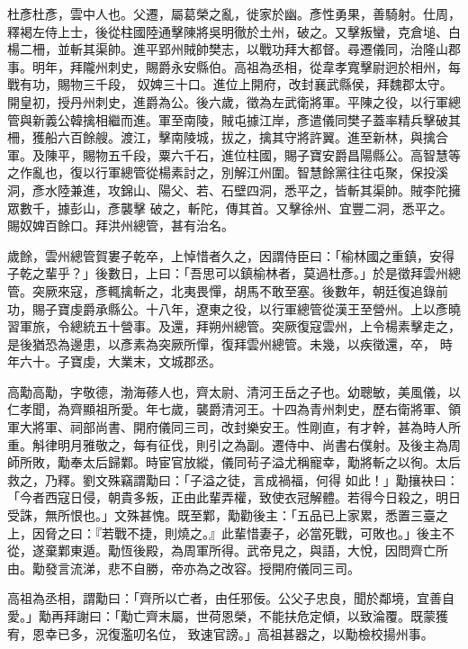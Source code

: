 
\begin{pinyinscope}

 杜彥杜彥，雲中人也。父遷，屬葛榮之亂，徙家於幽。彥性勇果，善騎射。仕周，釋褐左侍上士，後從柱國陸通擊陳將吳明徹於土州，破之。又擊叛蠻，克倉塠、白楊二柵，並斬其渠帥。進平郢州賊帥樊志，以戰功拜大都督。尋遷儀同，治隆山郡事。明年，拜隴州刺史，賜爵永安縣伯。高祖為丞相，從韋孝寬擊尉迥於相州，每戰有功，賜物三千段，
 奴婢三十口。進位上開府，改封襄武縣侯，拜魏郡太守。開皇初，授丹州刺史，進爵為公。後六歲，徵為左武衛將軍。平陳之役，以行軍總管與新義公韓擒相繼而進。軍至南陵，賊屯據江岸，彥遣儀同樊子蓋率精兵擊破其柵，獲船六百餘艘。渡江，擊南陵城，拔之，擒其守將許翼。進至新林，與擒合軍。及陳平，賜物五千段，粟六千石，進位柱國，賜子寶安爵昌陽縣公。高智慧等之作亂也，復以行軍總管從楊素討之，別解江州圍。智慧餘黨往往屯聚，保投溪洞，彥水陸兼進，攻錦山、陽父、若、石壁四洞，悉平之，皆斬其渠帥。賊李陀擁眾數千，據彭山，彥襲擊
 破之，斬陀，傳其首。又擊徐州、宜豐二洞，悉平之。賜奴婢百餘口。拜洪州總管，甚有治名。



 歲餘，雲州總管賀婁子乾卒，上悼惜者久之，因謂侍臣曰：「榆林國之重鎮，安得子乾之輩乎？」後數日，上曰：「吾思可以鎮榆林者，莫過杜彥。」於是徵拜雲州總管。突厥來寇，彥輒擒斬之，北夷畏憚，胡馬不敢至塞。後數年，朝廷復追錄前功，賜子寶虔爵承縣公。十八年，遼東之役，以行軍總管從漢王至營州。上以彥曉習軍旅，令總統五十營事。及還，拜朔州總管。突厥復寇雲州，上令楊素擊走之，是後猶恐為邊患，以彥素為突厥所憚，復拜雲州總管。未幾，以疾徵還，卒，
 時年六十。子寶虔，大業末，文城郡丞。



 高勱高勱，字敬德，渤海蓚人也，齊太尉、清河王岳之子也。幼聰敏，美風儀，以仁孝聞，為齊顯祖所愛。年七歲，襲爵清河王。十四為青州刺史，歷右衛將軍、領軍大將軍、祠部尚書、開府儀同三司，改封樂安王。性剛直，有才幹，甚為時人所重。斛律明月雅敬之，每有征伐，則引之為副。遷侍中、尚書右僕射。及後主為周師所敗，勱奉太后歸鄴。時宦官放縱，儀同茍子溢尤稱寵幸，勱將斬之以徇。太后救之，乃釋。劉文殊竊謂勱曰：「子溢之徒，言成禍福，何得
 如此！」勱攘袂曰：「今者西寇日侵，朝貴多叛，正由此輩弄權，致使衣冠解體。若得今日殺之，明日受誅，無所恨也。」文殊甚愧。既至鄴，勱勸後主：「五品已上家累，悉置三臺之上，因脅之曰：『若戰不捷，則燒之。』此輩惜妻子，必當死戰，可敗也。」後主不從，遂棄鄴東遁。勱恆後殿，為周軍所得。武帝見之，與語，大悅，因問齊亡所由。勱發言流涕，悲不自勝，帝亦為之改容。授開府儀同三司。



 高祖為丞相，謂勱曰：「齊所以亡者，由任邪佞。公父子忠良，聞於鄰境，宜善自愛。」勱再拜謝曰：「勱亡齊末屬，世荷恩榮，不能扶危定傾，以致淪覆。既蒙獲宥，恩幸已多，況復濫叨名位，
 致速官謗。」高祖甚器之，以勱檢校揚州事。




\end{pinyinscope}
